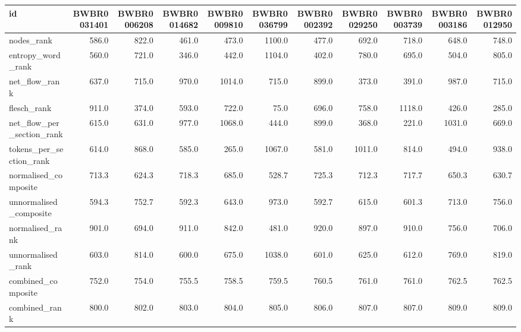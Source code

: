 \begin{tabular}{lrrrrrrrrrr}
\toprule
id & BWBR0031401 & BWBR0006208 & BWBR0014682 & BWBR0009810 & BWBR0036799 & BWBR0002392 & BWBR0029250 & BWBR0003739 & BWBR0003186 & BWBR0012950 \\
\midrule
nodes\_rank & 586.0 & 822.0 & 461.0 & 473.0 & 1100.0 & 477.0 & 692.0 & 718.0 & 648.0 & 748.0 \\
\cline{1-11}
entropy\_word\_rank & 560.0 & 721.0 & 346.0 & 442.0 & 1104.0 & 402.0 & 780.0 & 695.0 & 504.0 & 805.0 \\
\cline{1-11}
net\_flow\_rank & 637.0 & 715.0 & 970.0 & 1014.0 & 715.0 & 899.0 & 373.0 & 391.0 & 987.0 & 715.0 \\
\cline{1-11}
flesch\_rank & 911.0 & 374.0 & 593.0 & 722.0 & 75.0 & 696.0 & 758.0 & 1118.0 & 426.0 & 285.0 \\
\cline{1-11}
net\_flow\_per\_section\_rank & 615.0 & 631.0 & 977.0 & 1068.0 & 444.0 & 899.0 & 368.0 & 221.0 & 1031.0 & 669.0 \\
\cline{1-11}
tokens\_per\_section\_rank & 614.0 & 868.0 & 585.0 & 265.0 & 1067.0 & 581.0 & 1011.0 & 814.0 & 494.0 & 938.0 \\
\cline{1-11}
normalised\_composite & 713.3 & 624.3 & 718.3 & 685.0 & 528.7 & 725.3 & 712.3 & 717.7 & 650.3 & 630.7 \\
\cline{1-11}
unnormalised\_composite & 594.3 & 752.7 & 592.3 & 643.0 & 973.0 & 592.7 & 615.0 & 601.3 & 713.0 & 756.0 \\
\cline{1-11}
normalised\_rank & 901.0 & 694.0 & 911.0 & 842.0 & 481.0 & 920.0 & 897.0 & 910.0 & 756.0 & 706.0 \\
\cline{1-11}
unnormalised\_rank & 603.0 & 814.0 & 600.0 & 675.0 & 1038.0 & 601.0 & 625.0 & 612.0 & 769.0 & 819.0 \\
\cline{1-11}
combined\_composite & 752.0 & 754.0 & 755.5 & 758.5 & 759.5 & 760.5 & 761.0 & 761.0 & 762.5 & 762.5 \\
\cline{1-11}
combined\_rank & 800.0 & 802.0 & 803.0 & 804.0 & 805.0 & 806.0 & 807.0 & 807.0 & 809.0 & 809.0 \\
\cline{1-11}
\bottomrule
\end{tabular}
